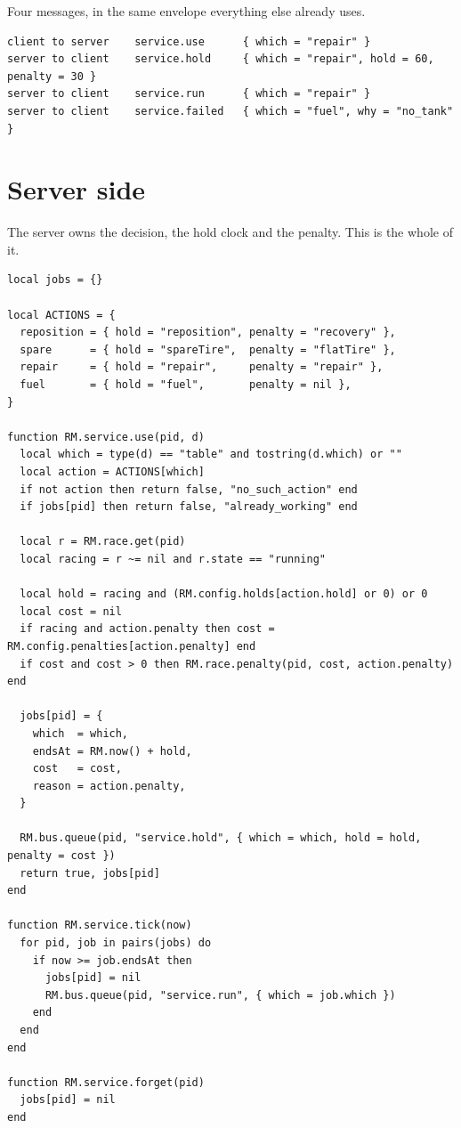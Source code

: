\documentclass[11pt,a4paper]{article}
\begin{document}
Four messages, in the same envelope everything else already uses.

\begin{lstlisting}
client to server    service.use      { which = "repair" }
server to client    service.hold     { which = "repair", hold = 60, penalty = 30 }
server to client    service.run      { which = "repair" }
server to client    service.failed   { which = "fuel", why = "no_tank" }
\end{lstlisting}

\section{Server side}

The server owns the decision, the hold clock and the penalty. This is the
whole of it.

\begin{lstlisting}
local jobs = {}

local ACTIONS = {
  reposition = { hold = "reposition", penalty = "recovery" },
  spare      = { hold = "spareTire",  penalty = "flatTire" },
  repair     = { hold = "repair",     penalty = "repair" },
  fuel       = { hold = "fuel",       penalty = nil },
}

function RM.service.use(pid, d)
  local which = type(d) == "table" and tostring(d.which) or ""
  local action = ACTIONS[which]
  if not action then return false, "no_such_action" end
  if jobs[pid] then return false, "already_working" end

  local r = RM.race.get(pid)
  local racing = r ~= nil and r.state == "running"

  local hold = racing and (RM.config.holds[action.hold] or 0) or 0
  local cost = nil
  if racing and action.penalty then cost = RM.config.penalties[action.penalty] end
  if cost and cost > 0 then RM.race.penalty(pid, cost, action.penalty) end

  jobs[pid] = {
    which  = which,
    endsAt = RM.now() + hold,
    cost   = cost,
    reason = action.penalty,
  }

  RM.bus.queue(pid, "service.hold", { which = which, hold = hold, penalty = cost })
  return true, jobs[pid]
end

function RM.service.tick(now)
  for pid, job in pairs(jobs) do
    if now >= job.endsAt then
      jobs[pid] = nil
      RM.bus.queue(pid, "service.run", { which = job.which })
    end
  end
end

function RM.service.forget(pid)
  jobs[pid] = nil
end
\end{lstlisting}
\end{document}
